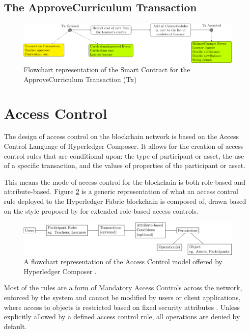 \subsection{The ApproveCurriculum Transaction}

\begin{figure}[!ht]
	\centering
	\includegraphics[width=1.0\textwidth]{actx}
	\caption[ApproveCurriculum Transaction flowchart]
	{Flowchart representation of the Smart Contract for the ApproveCurriculum Transaction (Tx)} \label{fig:actx}
\end{figure}

\section{Access Control}
The design of access control on the blockchain network is based on the Access Control Language of Hyperledger Composer.
It allows for the creation of access control rules that are conditional upon: the type of participant or asset,
the use of a specific transaction, and the values of properties of the participant or asset.

This means the mode of access control for the blockchain is both role-based and attribute-based.
Figure \ref{fig:ac_model} is a generic representation of what an access control rule deployed to the Hyperledger Fabric blockchain is composed of,
drawn based on the style proposed by \citet{poniszewska2005representation} for extended role-based access controls.\\

\begin{figure}[!ht]
	\centering
	\includegraphics[width=1.0\textwidth]{ac_model}
	\caption[Access Control Model of Hyperledger Composer]
	{A flowchart representation of the Access Control model offered by Hyperledger Composer \citep{official2018composer}.}
	\label{fig:ac_model}
\end{figure}

Most of the rules are a form of Mandatory Access Controls across the network, enforced by the system and cannot be modified by
users or client applications, where access to objects is restricted based on fixed security attributes \citep{yuan2005attributed}.
Unless explicitly allowed by a defined access control rule, all operations are denied by default.

